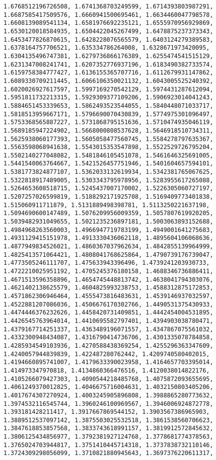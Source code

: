\documentclass[11pt]{article}
\begin{document}
\begin{Verbatim}[commandchars=\\\{\}]
1.6768512196726508, 1.6741368703249599, 1.6714393803987291, 1.6687585417509576, 1.6660941500695461, 1.6634460047798578, 1.6608139089541134, 1.6581976692235121, 1.6555970956929869, 1.6530120018584935, 1.6504422045267499, 1.6478875237373343, 1.6453477826870615, 1.6428228076565579, 1.6403124279389583, 1.6378164757706521, 1.635334786264008, 1.6328671973420095, 1.6304135496747381, 1.6279736866176389, 1.6255474541515129, 1.6231347008241741, 1.6207352776937196, 1.6183490382733574, 1.6159758384777427, 1.6136155365707716, 1.6112679931147862, 1.6089330709211445, 1.6066106350021132, 1.6043005525240392, 1.6020026927617597, 1.5997169270542129, 1.5974431287612094, 1.5951811732213315, 1.5929309377109206, 1.5906923014041243, 1.5884651453339653, 1.5862493523544055, 1.5840448071033717, 1.5818513959667171, 1.5796690070430839, 1.5774975301096497, 1.5753368565887227, 1.5731868795151636, 1.5710474935046119, 1.5689185947224902, 1.5668000808537628, 1.5646918510734311, 1.5625938060177393, 1.5605058477560745, 1.5584278797635367, 1.5563598068941638, 1.5543015353547898, 1.5522529726795204, 1.5502140277048082, 1.5481846105451078, 1.5461646325691005, 1.5441540063764667, 1.5421526457751946, 1.5401604657594101, 1.5381773824877107, 1.5362033132619934, 1.5342381765067625, 1.5322818917489005, 1.5303343795978956, 1.5283955617265088, 1.5264653608518715, 1.5245437007170002, 1.5226305060727197, 1.5207257026599819, 1.5188292171925708, 1.5169409773401838, 1.515060911711879, 1.5131889498398781, 1.5113250221637198, 1.5094690600147489, 1.5076209956009359, 1.5057807619920205, 1.5039482931049655, 1.5021235236897181, 1.5003063893152688, 1.4984968263560003, 1.4966947719783199, 1.4949001641275683, 1.4931129415151978, 1.4913330436062118, 1.4895604106068636, 1.4877949834526021, 1.4860367037962634, 1.4842855139964999, 1.4825413571064421, 1.4808041768625864, 1.4790739176739047, 1.4773505246111707, 1.475633943396496, 1.4739241203930733, 1.4722210025951192, 1.4705245376180158, 1.4688346736886411, 1.4671513596358896, 1.4654745448813742, 1.4638041794303076, 1.4621402138625579, 1.4604825993238753, 1.4588312875172853, 1.4571862306946464, 1.4555473816483631, 1.4539146937032597, 1.4522881207086036, 1.4506676170302766, 1.4490531375430933, 1.4474446376232626, 1.4458420731409851, 1.4442454004531895, 1.4426545763964014, 1.4410695582797401, 1.4394903038780471, 1.4379167714251337, 1.4363489196071557, 1.4347867075561032, 1.4332300948434087, 1.4316790414736706, 1.4301335078784858, 1.4285934549103936, 1.4270588438369254, 1.4255296363347609, 1.4240057944839839, 1.422487280762442, 1.4209740580402015, 1.4194660895741007, 1.4179633390023958, 1.4164657703395014, 1.414973347970818, 1.4134860366476516, 1.4120038014822176, 1.4105266079427303, 1.4090544218485768, 1.4075872093655695, 1.4061249370012825, 1.4046675716004631, 1.4032150803405206, 1.4017674307270924, 1.4003245905896808, 1.3988865280773632, 1.3974532116545744, 1.3960246100969567, 1.3946006924872778, 1.393181428211417, 1.3917667869544152, 1.3903567386965903, 1.3889512537097142, 1.3875503025532518, 1.3861538560706623, 1.3847618853857568, 1.3833743618991157, 1.3819912572845632, 1.3806125434856977, 1.3792381927124768, 1.3778681774378563, 1.3765024703944817, 1.3751410445714318, 1.3737838732110146, 1.3724309298056099, 1.3710821880945643, 1.3697376220611317, 
\end{Verbatim}
\end{document}
